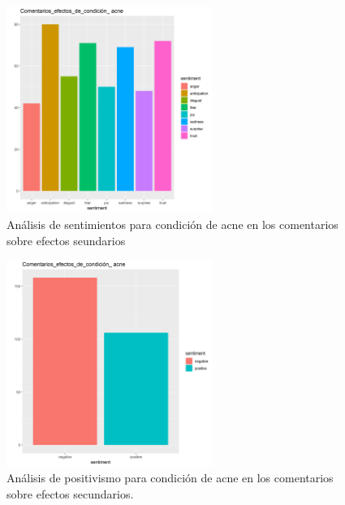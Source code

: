 \documentclass[spanish,]{article}
\begin{document}
\begin{figure}[h]
    \centering
    \includegraphics[width=0.6\textwidth]{figuras/sentimientos/Bacne1.png}
    \caption{Análisis de sentimientos para condición de acne en los comentarios sobre efectos seundarios}
    \label{fig:sentimientos:3}
\end{figure}

\begin{figure}[h]
    \centering
    \includegraphics[width=0.6\textwidth]{figuras/sentimientos/Bacne2.png}
    \caption{Análisis de positivismo para condición de acne en los comentarios sobre efectos secundarios.}
    \label{fig:sentimientos:4}
\end{figure}
\end{document}
